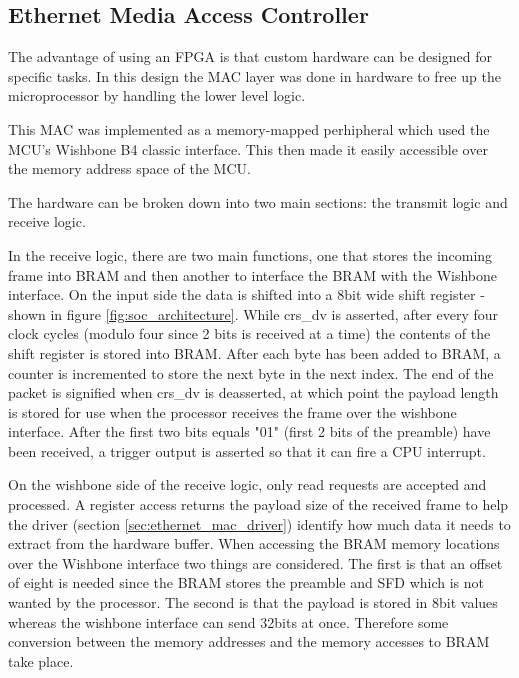 







\subsection{Ethernet Media Access Controller}
\label{sec:ethernet_mac}
The advantage of using an FPGA is that custom hardware can be designed for specific tasks. In this design the MAC layer was done in hardware to free up the microprocessor by handling the lower level logic. 

This MAC was implemented as a memory-mapped perhipheral which used the MCU's Wishbone B4 classic interface. This then made it easily accessible over the memory address space of the MCU.  



The hardware can be broken down into two main sections: the transmit logic and receive logic. 

In the receive logic, there are two main functions, one that stores the incoming frame into BRAM and then another to interface the BRAM with the Wishbone interface. On the input side the data is shifted into a 8bit wide shift register - shown in figure \ref{fig:soc_architecture}. While crs\_dv is asserted, after every four clock cycles (modulo four since 2 bits is received at a time) the contents of the shift register is stored into BRAM. After each byte has been added to BRAM, a counter is incremented to store the next byte in the next index. The end of the packet is signified when crs\_dv is deasserted, at which point the payload length is stored for use when the processor receives the frame over the wishbone interface. After the first two bits equals "01" (first 2 bits of the preamble) have been received, a trigger output is asserted so that it can fire a CPU interrupt.

On the wishbone side of the receive logic, only read requests are accepted and processed. A register access returns the payload size of the received frame to help the driver (section \ref{sec:ethernet_mac_driver}) identify how much data it needs to extract from the hardware buffer. When accessing the BRAM memory locations over the Wishbone interface two things are considered. The first is that an offset of eight is needed since the BRAM stores the preamble and SFD which is not wanted by the processor. The second is that the payload is stored in 8bit values whereas the wishbone interface can send 32bits at once. Therefore some conversion between the memory addresses and the memory accesses to BRAM take place. 

